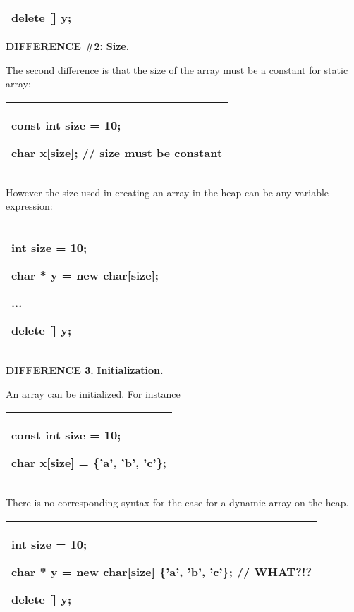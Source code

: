 \documentclass[
]{article}
\begin{document}
\begin{longtable}[]{@{}l@{}}
\toprule
\endhead
delete {[}{]} y;\tabularnewline
\bottomrule
\end{longtable}

\textbf{DIFFERENCE \#2:} \textbf{Size.}

The second difference is that the size of the array must be a constant
for static array:

\begin{longtable}[]{@{}l@{}}
\toprule
\endhead
\begin{minipage}[t]{0.97\columnwidth}\raggedright
const int size = 10;

char x{[}size{]}; // size must be constant\strut
\end{minipage}\tabularnewline
\bottomrule
\end{longtable}

However the size used in creating an array in the heap can be any
variable expression:

\begin{longtable}[]{@{}l@{}}
\toprule
\endhead
\begin{minipage}[t]{0.97\columnwidth}\raggedright
int size = 10;

char * y = new char{[}size{]};

...

delete {[}{]} y;\strut
\end{minipage}\tabularnewline
\bottomrule
\end{longtable}

\textbf{DIFFERENCE 3.} \textbf{Initialization.}

An array can be initialized. For instance

\begin{longtable}[]{@{}l@{}}
\toprule
\endhead
\begin{minipage}[t]{0.97\columnwidth}\raggedright
const int size = 10;

char x{[}size{]} = \{'a', 'b', 'c'\};\strut
\end{minipage}\tabularnewline
\bottomrule
\end{longtable}

There is no corresponding syntax for the case for a dynamic array on the
heap.

\begin{longtable}[]{@{}l@{}}
\toprule
\endhead
\begin{minipage}[t]{0.97\columnwidth}\raggedright
int size = 10;

char * y = new char{[}size{]} \{'a', 'b', 'c'\}; // WHAT?!?

delete {[}{]} y;\strut
\end{minipage}\tabularnewline
\bottomrule
\end{longtable}
\end{document}
